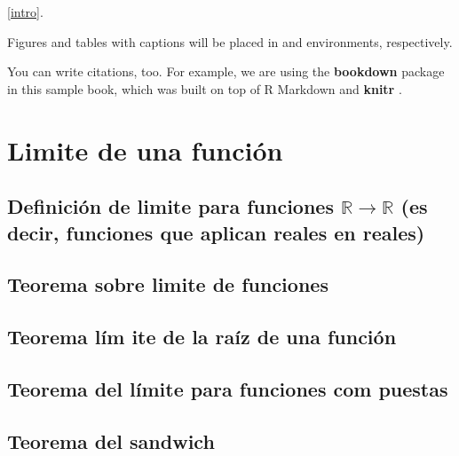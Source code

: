 \documentclass[12pt,]{report}
\theoremstyle{slplain}
\begin{document}
\ref{intro}.

Figures and tables with captions will be placed in and environments, respectively.

You can write citations, too. For example, we are using the \textbf{bookdown} package \citep{R-bookdown} in this sample book, which was built on top of R Markdown and \textbf{knitr} \citep{xie2015}.

\hypertarget{limite-de-una-funciuxf3n}{%
\chapter{Limite de una función}\label{limite-de-una-funciuxf3n}}

\hypertarget{definiciuxf3n-de-limite-para-funciones-mathbbrto-mathbbr-es-decir-funciones-que-aplican-reales-en-reales}{%
\section{\texorpdfstring{Definición de limite para funciones \(\mathbb{R}\to \mathbb{R}\) (es decir, funciones que aplican reales en reales)}{Definición de limite para funciones \textbackslash{}mathbb\{R\}\textbackslash{}to \textbackslash{}mathbb\{R\} (es decir, funciones que aplican reales en reales)}}\label{definiciuxf3n-de-limite-para-funciones-mathbbrto-mathbbr-es-decir-funciones-que-aplican-reales-en-reales}}

\hypertarget{teorema-sobre-limite-de-funciones}{%
\section{Teorema sobre limite de funciones}\label{teorema-sobre-limite-de-funciones}}

\hypertarget{teorema-luxedm-ite-de-la-rauxedz-de-una-funciuxf3n}{%
\section{Teorema lím ite de la raíz de una función}\label{teorema-luxedm-ite-de-la-rauxedz-de-una-funciuxf3n}}

\hypertarget{teorema-del-luxedmite-para-funciones-com-puestas}{%
\section{Teorema del límite para funciones com puestas}\label{teorema-del-luxedmite-para-funciones-com-puestas}}

\hypertarget{teorema-del-sandwich}{%
\section{Teorema del sandwich}\label{teorema-del-sandwich}}
\end{document}
